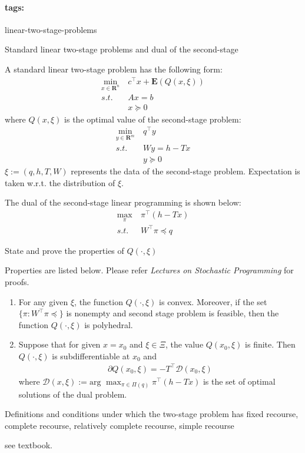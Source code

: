 \documentclass[11pt]{article}
\newcommand{\expect}[1]{\mathbf{E}(#1)}
\newcommand{\reals}{\mathbf{R}}
\newcommand*{\tags}[1]{\paragraph{tags: }#1\bigskip}
\newcommand*{\xfield}[1]{\begin{mdframed}\centering #1\end{mdframed}\bigskip}
\newenvironment{field}{}{}
\newenvironment{note}{}{}
\begin{document}
%
\tags{linear-two-stage-problems}
\begin{note}
  \xfield{Standard linear two-stage problems and dual of the second-stage}
  \begin{field}
    A standard linear two-stage problem has the following form:
    \begin{align*}
      \min_{x \in \reals^n} ~ & c^\top x + \expect{ Q(x, \xi) } \\
      s.t. ~ & Ax = b \\
      & x \succeq 0
    \end{align*}
    where \(Q(x, \xi)\) is the optimal value of the second-stage
    problem:
    \begin{align*}
      \min_{y \in \reals^m} ~ & q^\top y \\
      s.t. ~ & Wy = h - Tx \\
      & y \succeq 0
    \end{align*}
    \(\xi := (q, h, T, W)\) represents the data of the second-stage
    problem. Expectation is taken w.r.t. the distribution of \(\xi\).

    The dual of the second-stage linear programming is shown below:
    \begin{align*}
      \max_{\pi} ~ & \pi^\top (h - Tx) \\
      s.t. ~ & W^\top \pi \preceq q
    \end{align*}
  \end{field}
\end{note}
%
\begin{note}
  \xfield{State and prove the properties of \(Q(\cdot, \xi)\)}
  \begin{field}
    Properties are listed below. Please refer
    \textit{Lectures on Stochastic Programming} for proofs.
    \begin{enumerate}
    \item For any given \(\xi\), the function \(Q(\cdot, \xi)\) is
      convex. Moreover, if the set \(\{\pi : W^\top \pi \preceq\}\) is
      nonempty and second stage problem is feasible, then the function
      \(Q(\cdot, \xi)\) is polyhedral.
    \item Suppose that for given \(x = x_0\) and \(\xi \in \Xi\), the
      value \(Q(x_0, \xi)\) is finite. Then \(Q(\cdot, \xi)\) is
      subdifferentiable at \(x_0\) and
      \begin{align*}
        \partial Q(x_0, \xi) = -T^\top \mathcal{D}(x_0, \xi)
      \end{align*}
      where \(\mathcal{D}(x,\xi) := \text{arg } \max_{\pi \in \Pi(q)}
      \pi^\top (h - Tx)\) is the set of optimal solutions of the dual
      problem.
    \end{enumerate}
  \end{field}
\end{note}
%
\begin{note}
  \xfield{Definitions and conditions under which the two-stage problem
    has fixed recourse, complete recourse, relatively complete
    recourse, simple recourse}
  \begin{field}
    see textbook.
  \end{field}
\end{note}
\end{document}
